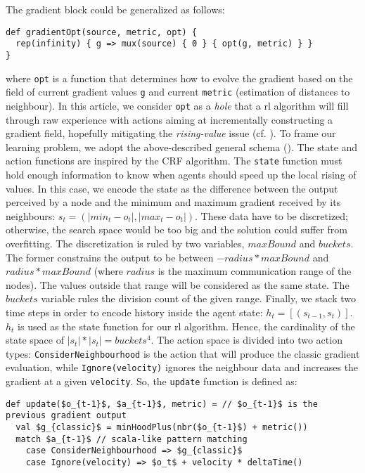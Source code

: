 The gradient block could be generalized as follows:
\begin{lstlisting}
def gradientOpt(source, metric, opt) {
  rep(infinity) { g => mux(source) { 0 } { opt(g, metric) } }
}
\end{lstlisting}
where \lstinline|opt| is a function that determines how to evolve the gradient based on the field of current gradient values \lstinline|g| and current \lstinline|metric| (estimation of distances to neighbour). 
In this article, we consider \lstinline|opt| as a \emph{hole} that a \ac{rl} algorithm will fill through raw experience
 with actions aiming at incrementally constructing a gradient field, hopefully mitigating the \emph{rising-value} issue (cf. ).
%
To frame our learning problem, we adopt the above-described general schema (). The state and action functions are inspired by the CRF algorithm.
%
The \lstinline|state| function must hold enough information to know when agents should speed up the local rising of values.
%
In this case, we encode the state as the difference between the output perceived by a node and the minimum and maximum gradient received by its neighbours: $s_t = (|min_t - o_t|, |max_t - o_t|)$. 
%
These data have to be discretized; otherwise, the search space would be too big and the solution could suffer from overfitting. 
%
The discretization is ruled by two variables, $maxBound$ and $buckets$. 
%
The former constrains the output to be between $ - radius * maxBound$ and $ radius * maxBound $ (where $radius$ is the maximum communication range of the nodes). 
%
The values outside that range will be considered as the same state.
%
The $buckets$ variable rules the division count of the given range. 
Finally, we stack two time steps in order to encode history inside the agent state:
$h_t = [(s_{t - 1}, s_t)]$. $h_t$ is used as the state function for our \ac{rl} algorithm.
Hence, the cardinality of the state space of $|s_t| * |s_t| = buckets^4$. 
%
The action space is divided into two action types: \texttt{ConsiderNeighbourhood} is the action that will produce the classic gradient evaluation, while 
 \texttt{Ignore(velocity)} ignores the neighbour data and increases the gradient at a given \texttt{velocity}. So, the \texttt{update} function is defined as:
\begin{lstlisting}[mathescape]
def update($o_{t-1}$, $a_{t-1}$, metric) = // $o_{t-1}$ is the previous gradient output
  val $g_{classic}$ = minHoodPlus(nbr($o_{t-1}$) + metric())
  match $a_{t-1}$ // scala-like pattern matching
    case ConsiderNeighbourhood => $g_{classic}$
    case Ignore(velocity) => $o_t$ + velocity * deltaTime() 
\end{lstlisting}
